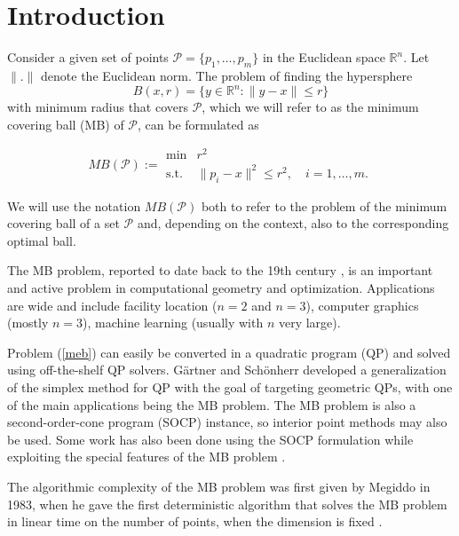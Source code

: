 \section{Introduction}
Consider a given set of points ${\mathcal{P}}=\{p_1,\hdots,p_m\}$ in the Euclidean space ${\mathbb{R}}^n$. Let~$\|.\|$ denote the Euclidean norm. The problem of finding the hypersphere $$B(x, r)=\{y\in{\mathbb{R}}^n: \|y-x\|\leq r\}$$ with minimum radius that covers ${\mathcal{P}}$, which we will refer to as the minimum covering ball (MB) of ${\mathcal{P}}$, can be formulated as

\begin{equation} MB({\mathcal{P}}) := \begin{array}{cl}\label{meb}
\min &r^2 \\
\text{s.t.} & \|p_i-x\|^2\leq r^2, \quad i=1,\hdots,m.
\end{array}
\end{equation}

\noindent We will use the notation $MB({\mathcal{P}})$ both to refer to the problem of the minimum covering ball of a set ${\mathcal{P}}$ and, depending on the context, also to the corresponding optimal ball.

\medskip

The MB problem, reported to date back to the 19th century \cite{Sylvester}, is an important and active problem in computational geometry and optimization. Applications are wide and include facility location ($n=2$ and $n=3$), computer graphics (mostly $n=3$), machine learning (usually with $n$ very large).

Problem (\ref{meb}) can easily be converted in a quadratic program (QP) and solved using off-the-shelf QP solvers. G{\"a}rtner and Sch{\"o}nherr \cite{Gartner00} developed a generalization of the simplex method for QP with the goal of targeting geometric QPs, with one of the main applications being the MB problem. The MB problem is also a second-order-cone program (SOCP) instance, so interior point methods may also be used. Some work has also been done using the SOCP formulation while exploiting the special features of the MB problem \cite{Kumar03,Zhou05}. 

The algorithmic complexity of the MB problem was first given by Megiddo in 1983, when he gave the first deterministic algorithm that solves the MB problem in linear time on the number of points, when the dimension is fixed \cite{Megiddo83,Megiddo84}.

